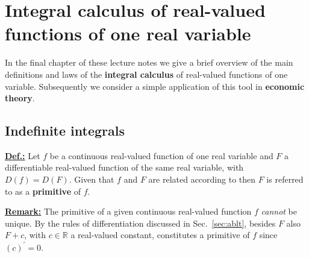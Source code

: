 \chapter[Integral calculus of real-valued functions]%
{Integral calculus of real-valued functions of one real variable}

\vspace{10mm}
\noindent
In the final chapter of these lecture notes we give a brief 
overview of the main definitions and laws of the {\bf integral 
calculus} of real-valued functions of one variable. Subsequently 
we consider a simple application of this tool in {\bf economic 
theory}.

\section[Indefinite integrals]{Indefinite integrals}
\underline{\bf Def.:} Let $f$ be a continuous real-valued function 
of one real variable and $F$ a differentiable real-valued function 
of the same real variable, with $D(f)=D(F)$. Given that $f$ and 
$F$ are related according to
%
\be
{}
\ee
%
then $F$ is referred to as a {\bf primitive} of $f$.

\medskip
\noindent
\underline{\bf Remark:} The primitive of a given continuous 
real-valued function $f$ \emph{cannot} be unique. By the rules of 
differentiation discussed in Sec.~\ref{sec:ablt}, besides $F$ 
also $F+c$, with $c \in \mathbb{R}$ a real-valued constant, 
constitutes a primitive of $f$ since $(c)^{\prime} = 0$.


